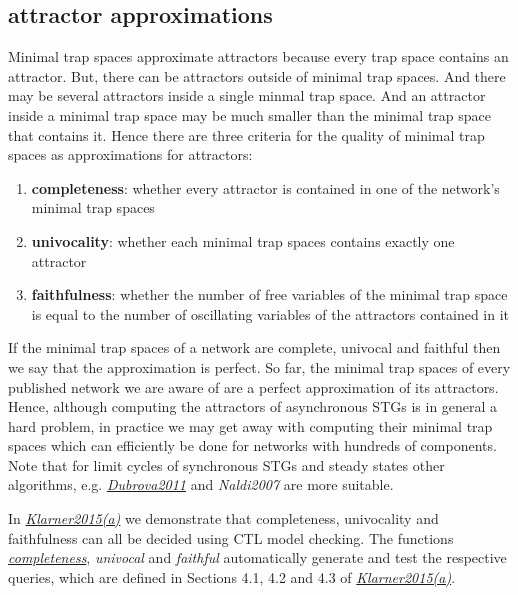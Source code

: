 \documentclass[letterpaper,10pt,english]{sphinxmanual}
\begin{document}
\subsection{attractor approximations}
\label{Manual:attractor-approximations}
Minimal trap spaces approximate attractors because every trap space contains an attractor.
But, there can be attractors outside of minimal trap spaces.
And there may be several attractors inside a single minmal trap space.
And an attractor inside a minimal trap space may be much smaller than the minimal trap space that contains it.
Hence there are three criteria for the quality of minimal trap spaces as approximations for attractors:
\begin{enumerate}
\item {} 
\textbf{completeness}: whether every attractor is contained in one of the network's minimal trap spaces

\item {} 
\textbf{univocality}: whether each minimal trap spaces contains exactly one attractor

\item {} 
\textbf{faithfulness}: whether the number of free variables of the minimal trap space is equal to the number of oscillating variables of the attractors contained in it

\end{enumerate}

If the minimal trap spaces of a network are complete, univocal and faithful then we say that the approximation is perfect.
So far, the minimal trap spaces of every published network we are aware of are a perfect approximation of its attractors.
Hence, although computing the attractors of asynchronous STGs is in general a hard problem,
in practice we may get away with computing their minimal trap spaces which can efficiently be done for networks with hundreds of components.
Note that for limit cycles of synchronous STGs and steady states other algorithms, e.g. {\hyperref[Bibliography:dubrova2011]{\emph{Dubrova2011}}} and \emph{Naldi2007} are more suitable.

In {\hyperref[Bibliography:klarner2015trap]{\emph{Klarner2015(a)}}} we demonstrate that completeness, univocality and faithfulness can all be decided using CTL model checking.
The functions {\hyperref[AttractorDetection:completeness]{\emph{completeness}}}, \emph{univocal} and \emph{faithful} automatically generate and test the respective queries,
which are defined in Sections 4.1, 4.2 and 4.3 of {\hyperref[Bibliography:klarner2015trap]{\emph{Klarner2015(a)}}}.
\end{document}
